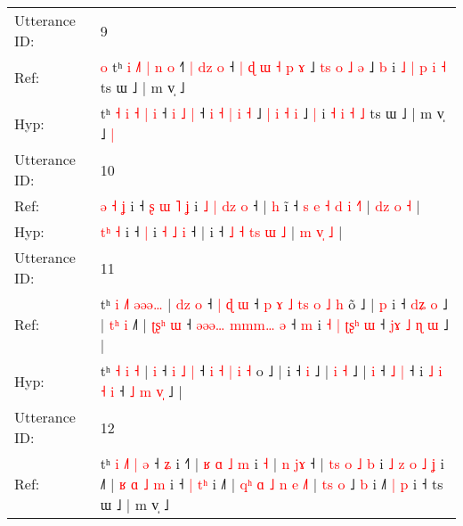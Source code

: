 \documentclass[10pt]{article}
\DeclareRobustCommand{\hl}[1]{{\textcolor{red}{#1}}}
\begin{document}
\begin{longtable}{ll}
 \\
\midrule
Utterance ID: & 9 \\
Ref: & \hl{o}\hl{ }tʰ \hl{i} \hl{˩}\hl{˥} \hl{|} \hl{n} \hl{o} ˧\hl{˥} \hl{|} \hl{d}\hl{z} \hl{o} ˧\hl{ }\hl{|} \hl{ɖ} \hl{ɯ} \hl{˧} \hl{p} \hl{ɤ} ˩ \hl{t}\hl{s} \hl{o} \hl{˩} \hl{ə} ˩ \hl{b} i\hl{ }\hl{˩} \hl{|} \hl{p} \hl{i} \hl{˧} ts ɯ ˩ | m v̩ ˩\hl{}\hl{}
 \\
Hyp: & \hl{}\hl{}tʰ \hl{˧} \hl{}\hl{i} \hl{˧} \hl{|} \hl{i} ˧\hl{} \hl{i} \hl{}\hl{˩} \hl{|} ˧\hl{}\hl{} \hl{i} \hl{˧} \hl{|} \hl{i} \hl{˧} ˩ \hl{}\hl{|} \hl{i} \hl{˧} \hl{i} ˩ \hl{|} i\hl{}\hl{} \hl{˧} \hl{i} \hl{˧} \hl{˩} ts ɯ ˩ | m v̩ ˩\hl{ }\hl{|}
 \\
\midrule
Utterance ID: & 10 \\
Ref: & \hl{ə}\hl{ }\hl{˧} \hl{ʝ} i ˧\hl{ }\hl{ʂ}\hl{ }\hl{ɯ}\hl{ }\hl{˥} \hl{ʝ} i\hl{ }\hl{˩} \hl{|} \hl{d}\hl{z} \hl{o} ˧ |\hl{ }\hl{h} i\hl{̃} ˧ \hl{s} \hl{e} \hl{˧}\hl{ }\hl{d} \hl{i} \hl{˧}\hl{˥} | \hl{d}\hl{z}\hl{ }\hl{o} \hl{˧} |
 \\
Hyp: & \hl{}\hl{t}\hl{ʰ} \hl{˧} i ˧\hl{}\hl{}\hl{}\hl{}\hl{}\hl{} \hl{|} i\hl{}\hl{} \hl{˧} \hl{}\hl{˩} \hl{i} ˧ |\hl{}\hl{} i\hl{} ˧ \hl{˩} \hl{˧} \hl{}\hl{t}\hl{s} \hl{ɯ} \hl{}\hl{˩} | \hl{m}\hl{ }\hl{v}\hl{̩} \hl{˩} |
 \\
\midrule
Utterance ID: & 11 \\
Ref: & tʰ \hl{i} \hl{˩}\hl{˥} \hl{ə}\hl{ə}\hl{ə}\hl{…} |\hl{ }\hl{d}\hl{z} \hl{o} ˧ \hl{|} \hl{ɖ} \hl{ɯ} ˧\hl{ }\hl{p}\hl{ }\hl{ɤ} \hl{˩} \hl{t}\hl{s} \hl{o} \hl{˩} \hl{h} o\hl{̃} ˩ |\hl{ }\hl{p} i ˧\hl{ }\hl{d}\hl{ʑ} \hl{o} ˩ | \hl{t}\hl{ʰ} \hl{i} ˩\hl{˥} |\hl{ }\hl{ʈ}\hl{ʂ}\hl{ʰ} \hl{ɯ} ˧\hl{ }\hl{ə}\hl{ə}\hl{ə}\hl{…} \hl{m}\hl{m}\hl{m}\hl{…} \hl{ə} ˧\hl{ }\hl{m} i \hl{˧} \hl{|} \hl{ʈ}\hl{ʂ}\hl{ʰ} \hl{ɯ} ˧ \hl{j}\hl{ɤ} \hl{˩} \hl{ɳ}\hl{ }\hl{ɯ} ˩ |
 \\
Hyp: & tʰ \hl{˧} \hl{}\hl{i} \hl{}\hl{}\hl{}\hl{˧} |\hl{}\hl{}\hl{} \hl{i} ˧ \hl{i} \hl{˩} \hl{|} ˧\hl{}\hl{}\hl{}\hl{} \hl{i} \hl{}\hl{˧} \hl{|} \hl{i} \hl{˧} o\hl{} ˩ |\hl{}\hl{} i ˧\hl{}\hl{}\hl{} \hl{i} ˩ | \hl{}\hl{i} \hl{˧} ˩\hl{} |\hl{}\hl{}\hl{}\hl{} \hl{i} ˧\hl{}\hl{}\hl{}\hl{}\hl{} \hl{}\hl{}\hl{}\hl{˩} \hl{|} ˧\hl{}\hl{} i \hl{˩} \hl{i} \hl{}\hl{}\hl{˧} \hl{i} ˧ \hl{}\hl{˩} \hl{m} \hl{}\hl{v}\hl{̩} ˩ |
 \\
\midrule
Utterance ID: & 12 \\
Ref: & tʰ\hl{ }\hl{i}\hl{ }\hl{˩}\hl{˥}\hl{ }\hl{|}\hl{ }\hl{ə} ˧\hl{ }\hl{ʑ} i ˧\hl{˥} |\hl{ }\hl{ʁ}\hl{ }\hl{ɑ} \hl{˩} \hl{m} i \hl{˧} | \hl{n} \hl{j}\hl{ɤ} ˧ |\hl{ }\hl{t}\hl{s}\hl{ }\hl{o}\hl{ }\hl{˩}\hl{ }\hl{b} i\hl{ }\hl{˩}\hl{ }\hl{z}\hl{ }\hl{o}\hl{ }\hl{˩} \hl{ʝ} i ˩\hl{˥} |\hl{ }\hl{ʁ}\hl{ }\hl{ɑ}\hl{ }\hl{˩}\hl{ }\hl{m} i ˧\hl{ }\hl{|}\hl{ }\hl{t}\hl{ʰ} i ˩\hl{˥} |\hl{ }\hl{q}\hl{ʰ}\hl{ }\hl{ɑ}\hl{ }\hl{˩}\hl{ }\hl{n} \hl{e} \hl{˩}\hl{˥} | \hl{t}\hl{s} \hl{o} ˩ \hl{b} i ˩\hl{˥}\hl{ }\hl{|}\hl{ }\hl{p} i ˧ ts ɯ ˩ | m v̩ ˩\hl{}\hl{}

\end{longtable}
\end{document}
